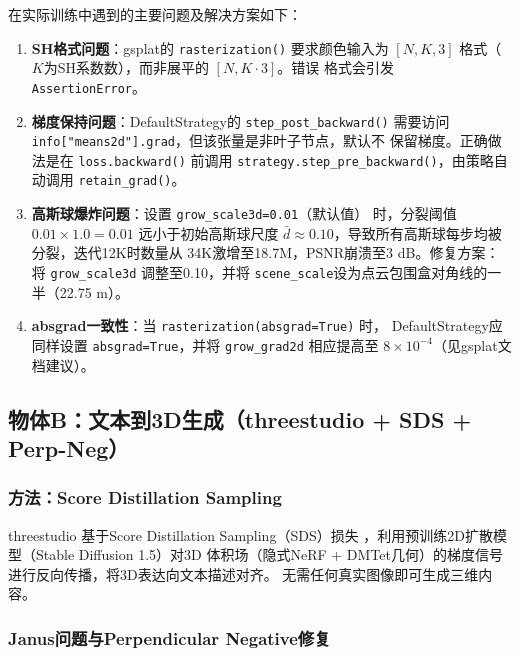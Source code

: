 \documentclass{article}
\begin{document}
在实际训练中遇到的主要问题及解决方案如下：

\begin{enumerate}
  \item \textbf{SH格式问题}：gsplat的 \texttt{rasterization()} 要求颜色输入为
        $[N, K, 3]$ 格式（$K$为SH系数数），而非展平的 $[N, K\cdot3]$。错误
        格式会引发 \texttt{AssertionError}。
  \item \textbf{梯度保持问题}：DefaultStrategy的 \texttt{step\_post\_backward()}
        需要访问 \texttt{info["means2d"].grad}，但该张量是非叶子节点，默认不
        保留梯度。正确做法是在 \texttt{loss.backward()} 前调用
        \texttt{strategy.step\_pre\_backward()}，由策略自动调用
        \texttt{retain\_grad()}。
  \item \textbf{高斯球爆炸问题}：设置 \texttt{grow\_scale3d=0.01}（默认值）
        时，分裂阈值 $0.01 \times 1.0 = 0.01$ 远小于初始高斯球尺度
        $\bar{d}\approx0.10$，导致所有高斯球每步均被分裂，迭代12K时数量从
        34K激增至18.7M，PSNR崩溃至3 dB。修复方案：将
        \texttt{grow\_scale3d} 调整至0.10，并将
        \texttt{scene\_scale}设为点云包围盒对角线的一半（22.75 m）。
  \item \textbf{absgrad一致性}：当 \texttt{rasterization(absgrad=True)} 时，
        DefaultStrategy应同样设置 \texttt{absgrad=True}，并将
        \texttt{grow\_grad2d} 相应提高至 $8\times10^{-4}$（见gsplat文档建议）。
\end{enumerate}

\subsection{物体B：文本到3D生成（threestudio + SDS + Perp-Neg）}
\label{sec:objB}

\subsubsection{方法：Score Distillation Sampling}

threestudio \cite{threestudio2023}基于Score Distillation Sampling（SDS）损失
\cite{poole2022dreamfusion}，利用预训练2D扩散模型（Stable Diffusion 1.5）对3D
体积场（隐式NeRF + DMTet几何）的梯度信号进行反向传播，将3D表达向文本描述对齐。
无需任何真实图像即可生成三维内容。

\subsubsection{Janus问题与Perpendicular Negative修复}
\end{document}
